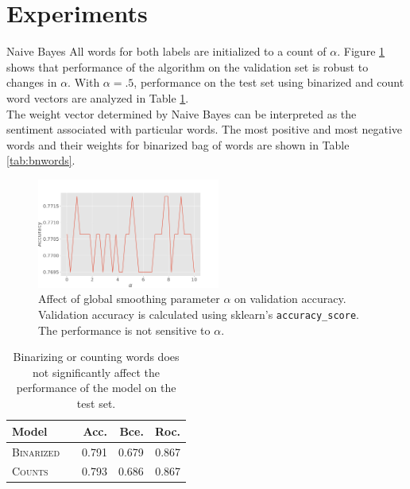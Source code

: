 \documentclass[11pt]{article}
\begin{document}
\section{Experiments}

\begin{subsection}{Naive Bayes}
All words for both labels are initialized to a count of $\alpha$. Figure \ref{fig:clusters} shows that performance of the algorithm on the validation set is robust to changes in $\alpha$. With $\alpha=.5$, performance on the test set using binarized and count word vectors are analyzed in Table \ref{tab:nb}.\\
The weight vector determined by Naive Bayes can be interpreted as the sentiment associated with particular words. The most positive and most negative words and their weights for binarized bag of words are shown in Table \ref{tab:bnwords}.



\begin{figure}
  \centering
  \includegraphics[width=6cm]{imgs/alpha}
  \caption{\label{fig:clusters} Affect of global smoothing parameter $\alpha$ on validation accuracy. Validation accuracy is calculated using sklearn's \texttt{accuracy\_score}. The performance is not sensitive to $\alpha$.}
\end{figure}

\begin{table}[h]
\centering
\begin{tabular}{llrrr}
 \toprule
 Model &  & Acc. & Bce. & Roc.\\
 \midrule
 \textsc{Binarized} & & 0.791 & 0.679 & 0.867\\
 \textsc{Counts} & & 0.793  & 0.686 & 0.867\\
 \bottomrule
\end{tabular}
\caption{\label{tab:nb} Binarizing or counting words does not significantly affect the performance of the model on the test set.}
\end{table}




\end{subsection}
\end{document}
